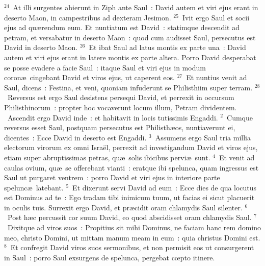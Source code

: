 ${}^{24}$~At illi surgentes abierunt in Ziph ante Saul~: David autem et viri ejus erant in deserto Maon, in campestribus ad dexteram Jesimon.
${}^{25}$~Ivit ergo Saul et socii ejus ad qu\ae rendum eum. Et nuntiatum est David~: statimque descendit ad petram, et versabatur in deserto Maon~: quod cum audisset Saul, persecutus est David in deserto Maon.
${}^{26}$~Et ibat Saul ad latus montis ex parte una~: David autem et viri ejus erant in latere montis ex parte altera. Porro David desperabat se posse evadere a facie Saul~: itaque Saul et viri ejus in modum coron\ae\ cingebant David et viros ejus, ut caperent eos.
${}^{27}$~Et nuntius venit ad Saul, dicens~: Festina, et veni, quoniam infuderunt se Philisthiim super terram.
${}^{28}$~Reversus est ergo Saul desistens persequi David, et perrexit in occursum Philisthinorum~: propter hoc vocaverunt locum illum, Petram dividentem.
~\lettrine[lines=10,image=true,loversize=0.05,lraise=-0.03]{A}{}scendit ergo David inde~: et habitavit in locis tutissimis Engaddi.
${}^{2}$~Cumque reversus esset Saul, postquam persecutus est Philisth\ae os, nuntiaverunt ei, dicentes~: Ecce David in deserto est Engaddi.
${}^{3}$~Assumens ergo Saul tria millia electorum virorum ex omni Isra\"el, perrexit ad investigandum David et viros ejus, etiam super abruptissimas petras, qu\ae\ solis ibicibus pervi\ae\ sunt.
${}^{4}$~Et venit ad caulas ovium, qu\ae\ se offerebant vianti~: eratque ibi spelunca, quam ingressus est Saul ut purgaret ventrem~: porro David et viri ejus in interiore parte spelunc\ae\ latebant.
${}^{5}$~Et dixerunt servi David ad eum~: Ecce dies de qua locutus est Dominus ad te~: Ego tradam tibi inimicum tuum, ut facias ei sicut placuerit in oculis tuis. Surrexit ergo David, et pr\ae cidit oram chlamydis Saul silenter.
${}^{6}$~Post h\ae c percussit cor suum David, eo quod abscidisset oram chlamydis Saul.
${}^{7}$~Dixitque ad viros suos~: Propitius sit mihi Dominus, ne faciam hanc rem domino meo, christo Domini, ut mittam manum meam in eum~: quia christus Domini est.
${}^{8}$~Et confregit David viros suos sermonibus, et non permisit eos ut consurgerent in Saul~: porro Saul exsurgens de spelunca, pergebat cœpto itinere.


